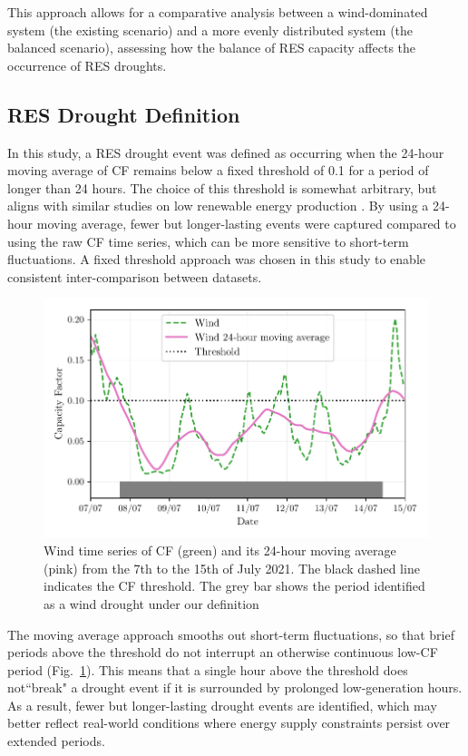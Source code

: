 \documentclass[a4paper, 11p1t]{article}
\begin{document}
This approach allows for a comparative analysis between a wind-dominated system (the existing scenario) and a more evenly distributed system (the balanced scenario), assessing how the balance of RES capacity affects the occurrence of RES droughts.

\subsection{RES Drought Definition}
\label{sec:res_drought}

In this study, a RES drought event was defined as occurring when the 24-hour moving average of CF remains below a fixed threshold of 0.1 for a period of longer than 24 hours. The choice of this threshold is somewhat arbitrary, but aligns with similar studies on low renewable energy production \cite{kaspar2019drought, ohba2022drought, mayer2023drought}. By using a 24-hour moving average, fewer but longer-lasting events were captured compared to using the raw CF time series, which can be more sensitive to short-term fluctuations. A fixed threshold approach was chosen in this study to enable consistent inter-comparison between datasets.

\begin{figure}[ht!]
	\centering
	\includegraphics{droughts_methodology.pdf}
	\caption{Wind time series of CF (green) and its 24-hour moving average (pink) from the 7th to the 15th of July 2021. The black dashed line indicates the CF threshold. The grey bar shows the period identified as a wind drought under our definition}
	\label{fig:find_res_droughts}
\end{figure}

The moving average approach smooths out short-term fluctuations, so that brief periods above the threshold do not interrupt an otherwise continuous low-CF period (Fig.~\ref{fig:find_res_droughts}). This means that a single hour above the threshold does not``break" a drought event if it is surrounded by prolonged low-generation hours. As a result, fewer but longer-lasting drought events are identified, which may better reflect real-world conditions where energy supply constraints persist over extended periods.
\end{document}
